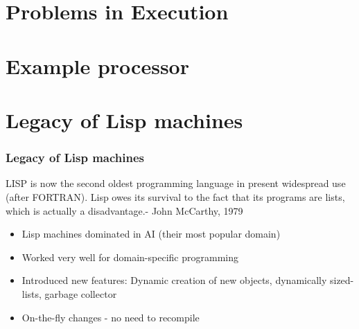 \documentclass{beamer}
\begin{document}
\section{Problems in Execution}

\section{Example processor}

\section{Legacy of Lisp machines}

\begin{frame}
	\frametitle{Legacy of Lisp machines}
		\begin{block}{ }
		LISP is now the second oldest programming language in present widespread use (after FORTRAN). Lisp owes its survival to the fact that its programs are lists, which is actually a disadvantage.\newline\newline-
		John McCarthy, 1979
		\end{block}
		
			\begin{itemize}
				\item Lisp machines dominated in AI (their most popular domain)
				\item Worked very well for domain-specific programming
				\item Introduced new features: Dynamic creation of new objects, dynamically sized-lists, garbage collector
				\item On-the-fly changes - no need to recompile\newline
			\end{itemize}
	
\end{frame}
\end{document}
